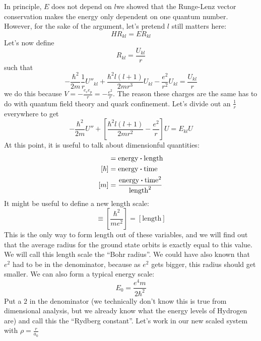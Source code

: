 \documentclass[a4paper,twoside,master.tex]{subfiles}
\begin{document}
In principle, $ E $ does not depend on $ l $\textemdash we showed that the Runge-Lenz vector conservation makes the energy only dependent on one quantum number. However, for the sake of the argument, let's pretend $ l $ still matters here:
\begin{equation}
    H R_{kl} = E R_{kl}
\end{equation}
Let's now define
\begin{equation}
    R_{kl} = \frac{U_{kl}}{r}
\end{equation}
such that
\begin{equation}
    - \frac{\hbar^2}{2m} \frac{1}{r} U''_{kl} + \frac{\hbar^2 l(l+1)}{2mr^3} U_{kl} - \frac{e^2}{r^2} U_{kl} = \frac{U_{kl}}{r}
\end{equation}
we do this because $ V = - \frac{e_e e_p}{r} = - \frac{e^2}{r} $. The reason these charges are the same has to do with quantum field theory and quark confinement. Let's divide out an $ \frac{1}{r} $ everywhere to get
\begin{equation}
    - \frac{\hbar^2}{2 m} U'' + \left[ \frac{\hbar^2 l(l+1)}{2mr^2} - \frac{e^2}{r} \right] U = E_{kl} U
\end{equation}
At this point, it is useful to talk about dimensionful quantities:
\begin{align}
    [e^2] &= \text{energy} \vdot \text{length} \\
    [\hbar] &= \text{energy} \vdot \text{time} \\
    [m] &= \frac{\text{energy} \vdot \text{time}^2}{\text{length}^2}
\end{align}
It might be useful to define a new length scale:
\begin{equation}
    [a_0] \equiv \left[ \frac{\hbar^2}{me^2} \right] = [\text{length}]
\end{equation}
This is the only way to form length out of these variables, and we will find out that the average radius for the ground state orbits is exactly equal to this value. We will call this length scale the ``Bohr radius''. We could have also known that $ e^2 $ had to be in the denominator, because as $ e^2 $ gets bigger, this radius should get smaller. We can also form a typical energy scale:
\begin{equation}
    E_0 = \frac{e^4 m}{2\hbar^2} 
\end{equation}
Put a $ 2 $ in the denominator (we technically don't know this is true from dimensional analysis, but we already know what the energy levels of Hydrogen are) and call this the ``Rydberg constant''. Let's work in our new scaled system with $ \rho = \frac{r}{a_0} $
\end{document}
